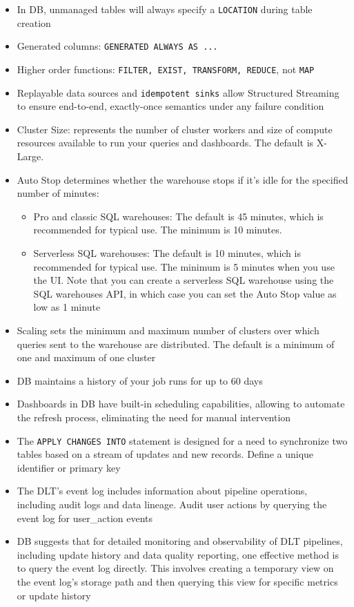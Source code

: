 \documentclass[11pt]{scrartcl}
\begin{document}
\begin{itemize}
	\item In DB, unmanaged tables will always specify a \texttt{LOCATION} during table creation
	\item Generated columns: \texttt{GENERATED ALWAYS AS ...}
	\item Higher order functions: \texttt{FILTER, EXIST, TRANSFORM, REDUCE}, not \texttt{MAP}
	\item Replayable data sources and \texttt{idempotent sinks} allow Structured Streaming to ensure end-to-end, exactly-once semantics under any failure condition
	\item Cluster Size: represents the number of cluster workers and size of compute resources available to run your queries and dashboards. The default is X-Large. 
	\item Auto Stop determines whether the warehouse stops if it's idle for the specified number of minutes:
	\begin{itemize}
		\item Pro and classic SQL warehouses: The default is 45 minutes, which is recommended for typical use. The minimum is 10 minutes.
		\item Serverless SQL warehouses: The default is 10 minutes, which is recommended for typical use. The minimum is 5 minutes when you use the UI. Note that you can create a serverless SQL warehouse using the SQL warehouses API, in which case you can set the Auto Stop value as low as 1 minute
	\end{itemize}
	\item Scaling sets the minimum and maximum number of clusters over which queries sent to the warehouse are distributed. The default is a minimum of one and maximum of one cluster
	\item DB maintains a history of your job runs for up to 60 days
	\item Dashboards in DB have built-in scheduling capabilities, allowing to automate the refresh process, eliminating the need for manual intervention
	\item The \texttt{APPLY CHANGES INTO} statement is designed for a need to synchronize two tables based on a stream of updates and new records. Define a unique identifier or primary key
	\item The DLT's event log includes information about pipeline operations, including audit logs and data lineage. Audit user actions by querying the event log for user\_action events
	\item DB suggests that for detailed monitoring and observability of DLT pipelines, including update history and data quality reporting, one effective method is to query the event log directly. This involves creating a temporary view on the event log's storage path and then querying this view for specific metrics or update history

\end{itemize}
\end{document}
